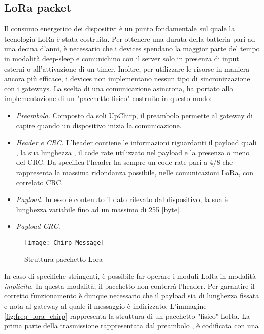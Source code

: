\subsection{LoRa packet}
Il consumo energetico dei dispositivi è un punto fondamentale sul quale la
tecnologia LoRa è stata costruita.  Per ottenere una durata della batteria pari
ad una decina d'anni, è necessario che i devices spendano la maggior parte del
tempo in modalità deep-sleep e comunichino con il server solo in presenza di
input esterni o all'attivazione di un timer.  Inoltre, per utilizzare
le risorse in maniera ancora più efficace, i devices non implementano nessun tipo
di sincronizzazione con i gateways. La scelta di una comunicazione asincrona, ha
portato alla implementazione di un "pacchetto fisico" costruito in questo
modo:
\begin{itemize}
        \item   \emph{Preambolo.}  Composto da soli UpChirp, il preambolo permette al gateway
                di capire quando un dispositivo inizia la comunicazione.
        \item   \emph{Header e CRC.} L'header contiene le informazioni riguardanti
                il payload quali , la sua lunghezza , il code rate utilizzato nel
                payload e la presenza o meno del CRC. Da specifica l'header ha sempre
                un code-rate pari a 4/8 che rappresenta la massima ridondanza
                possibile, nelle comunicazioni LoRa, con
                correlato CRC. 
        \item   \emph{Payload.} In esso è contenuto il dato rilevato dal
                dispositivo, la sua è  lunghezza variabile fino ad
                un massimo di 255 [byte].
        \item   \emph{Payload CRC.}
\end{itemize}
\begin{figure}[ht]
        \centering 
                \texttt{[image: Chirp\_Message]}
        \caption{Struttura pacchetto Lora }
        \label{fig:phis_pack}
\end{figure}
In caso di specifiche stringenti, è possibile far operare i moduli LoRa in
modalità \emph{implicita}. In questa modalità, il pacchetto non conterrà
l'header. Per garantire il corretto funzionamento è dunque necessario che il
payload sia di lunghezza fissata e nota al gateway al quale il messaggio è
indirizzato.
L'immagine  \ref{fig:freq_lora_chirp} rappresenta la struttura di un  
pacchetto "fisico" LoRa.
La prima parte della trasmissione rappresentata dal  preambolo , è codificata con una
